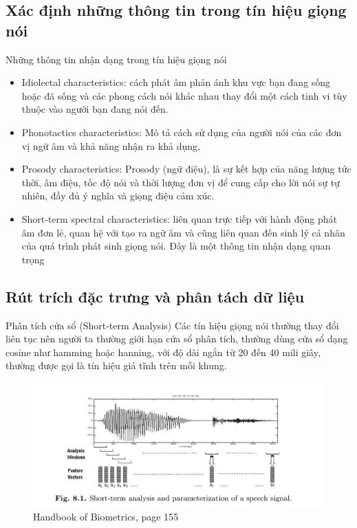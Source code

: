 \documentclass[notheorems, aspectratio=54]{beamer}
\begin{document}
\subsection{Xác định những thông tin trong tín hiệu giọng nói}
\begin{frame}
	Những thông tin nhận dạng trong tín hiệu giọng nói
	\begin{itemize}
		\item Idiolectal characteristics: cách phát âm phản ánh khu vực bạn đang sống hoặc đã sống và các phong cách nói khác nhau thay đổi một cách tinh vi tùy thuộc vào người bạn đang nói đến.
		\item Phonotactics characteristics: Mô tả cách sử dụng của người nói của các đơn vị ngữ âm và khả năng nhận ra khả dụng. 
		\item Prosody characteristics: Prosody (ngữ điệu), là sự kết hợp của năng lượng tức thời, âm điệu, tốc độ nói và thời lượng đơn vị để cung cấp cho lời nói sự tự nhiên, đầy đủ ý nghĩa và giọng điệu cảm xúc.
		\item Short-term spectral characteristics: liên quan trực tiếp với hành động phát âm đơn lẻ, quan hệ với tạo ra ngữ âm và cũng liên quan đến sinh lý cá nhân của quá trình phát sinh giọng nói. Đây là một thông tin nhận dạng quan trọng
	\end{itemize}
\end{frame}

\subsection{Rút trích đặc trưng và phân tách dữ liệu}
\begin{frame}{Phân tích cửa sổ (Short-term Analysis)}
	Các tín hiệu giọng nói thường thay đổi liên tục nên người ta thường giới hạn cửa sổ phân tích, thường dùng cửa sổ dạng cosine như hamming hoặc hanning, với độ dài ngắn từ 20 đến 40 mili giây, thường được gọi là tín hiệu giả tĩnh trên mỗi khung.
	\begin{figure}[h!]
		\includegraphics[width=0.9\linewidth]{images/figure_8_1.png}
		\caption{Handbook of Biometrics, page 155}
		\label{fig:writing-thesis}
	\end{figure}
\end{frame}
\end{document}
